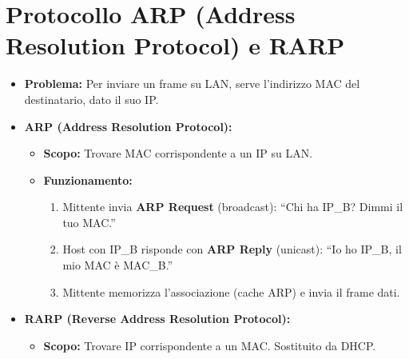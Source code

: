 \section{Protocollo ARP (Address Resolution Protocol) e RARP}
\begin{itemize}
    \item \textbf{Problema:} Per inviare un frame su LAN, serve l'indirizzo MAC del destinatario, dato il suo IP.
    \item \textbf{ARP (Address Resolution Protocol):}
    \begin{itemize}
        \item \textbf{Scopo:} Trovare MAC corrispondente a un IP su LAN.
        \item \textbf{Funzionamento:}
        \begin{enumerate}
            \item Mittente invia \textbf{ARP Request} (broadcast): ``Chi ha IP\_B? Dimmi il tuo MAC.''
            \item Host con IP\_B risponde con \textbf{ARP Reply} (unicast): ``Io ho IP\_B, il mio MAC è MAC\_B.''
            \item Mittente memorizza l'associazione (cache ARP) e invia il frame dati.
        \end{enumerate}
    \end{itemize}
    \item \textbf{RARP (Reverse Address Resolution Protocol):}
    \begin{itemize}
        \item \textbf{Scopo:} Trovare IP corrispondente a un MAC. Sostituito da DHCP.
    \end{itemize}
\end{itemize}

